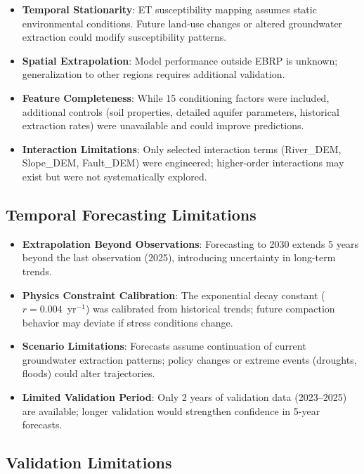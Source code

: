\begin{itemize}
\item \textbf{Temporal Stationarity}: ET susceptibility mapping assumes static environmental conditions. Future land-use changes or altered groundwater extraction could modify susceptibility patterns.
\item \textbf{Spatial Extrapolation}: Model performance outside EBRP is unknown; generalization to other regions requires additional validation.
\item \textbf{Feature Completeness}: While 15 conditioning factors were included, additional controls (soil properties, detailed aquifer parameters, historical extraction rates) were unavailable and could improve predictions.
\item \textbf{Interaction Limitations}: Only selected interaction terms (River\_DEM, Slope\_DEM, Fault\_DEM) were engineered; higher-order interactions may exist but were not systematically explored.
\end{itemize}

\subsection{Temporal Forecasting Limitations}

\begin{itemize}
\item \textbf{Extrapolation Beyond Observations}: Forecasting to 2030 extends 5 years beyond the last observation (2025), introducing uncertainty in long-term trends.
\item \textbf{Physics Constraint Calibration}: The exponential decay constant ($r = 0.004$~yr$^{-1}$) was calibrated from historical trends; future compaction behavior may deviate if stress conditions change.
\item \textbf{Scenario Limitations}: Forecasts assume continuation of current groundwater extraction patterns; policy changes or extreme events (droughts, floods) could alter trajectories.
\item \textbf{Limited Validation Period}: Only 2 years of validation data (2023--2025) are available; longer validation would strengthen confidence in 5-year forecasts.
\end{itemize}

\subsection{Validation Limitations}

